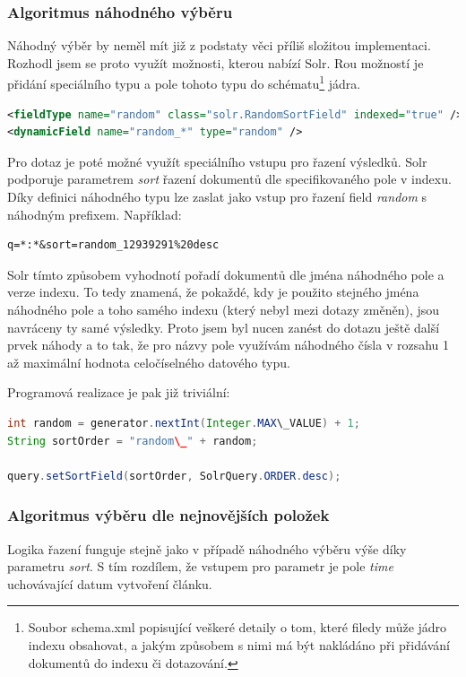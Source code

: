 \documentclass[thesis=M,czech]{FITthesis}[2014/05/07]
\begin{document}
\subsubsection{Algoritmus náhodného výběru}
Náhodný výběr by neměl mít již z podstaty věci příliš složitou implementaci. Rozhodl jsem se proto využít možnosti, kterou nabízí Solr. Rou možností je přidání speciálního typu a pole tohoto typu do schématu\footnote{Soubor schema.xml popisující veškeré detaily o tom, které filedy může jádro indexu obsahovat, a jakým způsobem s nimi má být nakládáno při přidávání dokumentů do indexu či dotazování.} jádra. 

\begin{lstlisting}[language=xml]
<fieldType name="random" class="solr.RandomSortField" indexed="true" />
<dynamicField name="random_*" type="random" />
\end{lstlisting}

Pro dotaz je poté možné využít speciálního vstupu pro řazení výsledků. Solr podporuje parametrem \emph{sort} řazení dokumentů dle specifikovaného pole v indexu. Díky definici náhodného typu lze zaslat jako vstup pro řazení field \emph{random} s náhodným prefixem. Například:

\begin{verbatim}
q=*:*&sort=random_12939291%20desc
\end{verbatim}

Solr tímto způsobem vyhodnotí pořadí dokumentů dle jména náhodného pole a verze indexu. To tedy znamená, že pokaždé, kdy je použito stejného jména náhodného pole a toho samého indexu (který nebyl mezi dotazy změněn), jsou navráceny ty samé výsledky. Proto jsem byl nucen zanést do dotazu ještě další prvek náhody a to tak, že pro názvy pole využívám náhodného čísla v rozsahu 1 až maximální hodnota celočíselného datového typu.

Programová realizace je pak již triviální:

\begin{lstlisting}[language=java]
int random = generator.nextInt(Integer.MAX\_VALUE) + 1;
String sortOrder = "random\_" + random;
  
query.setSortField(sortOrder, SolrQuery.ORDER.desc);
\end{lstlisting}       

\subsubsection{Algoritmus výběru dle nejnovějších položek}
Logika řazení funguje stejně jako v případě náhodného výběru výše díky parametru \emph{sort}. S tím rozdílem, že vstupem pro parametr je pole \emph{time} uchovávající datum vytvoření článku.
\end{document}
